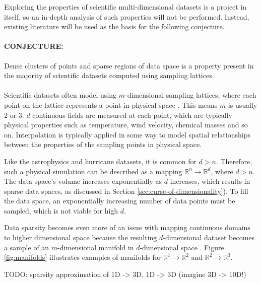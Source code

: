 Exploring the properties of scientific multi-dimensional datasets is a project in itself, so an in-depth analysis of such properties will not be performed. Instead, existing literature will be used as the basis for the following conjecture.

\paragraph{\textbf{CONJECTURE:}} Dense clusters of points and sparse regions of data space is a property present in the majority of scientific datasets computed using sampling lattices.
\paragraph{}

Scientific datasets often model using $m$-dimensional sampling lattices, where each point on the lattice represents a point in physical space \cite{TODO}. This means $m$ is usually 2 or 3. $d$ continuous fields are measured at each point, which are typically physical properties such as temperature, wind velocity, chemical masses and so on. Interpolation is typically applied in some way to model spatial relationships between the properties of the sampling points in physical space.

Like the astrophysics and hurricane datasets, it is common for $d > n$. Therefore, such a physical simulation can be described as a mapping $\mathbb{R}^n \rightarrow \mathbb{R}^d$, where $d > n$. The data space's volume increases exponentially as $d$ increases, which results in sparse data spaces, as discussed in Section \ref{sec:curse-of-dimensionality}). To fill the data space, an exponentially increasing number of data points must be sampled, which is not viable for high $d$.

Data sparsity becomes even more of an issue with mapping continuous domains to higher dimensional space because the resulting $d$-dimensional dataset becomes a sample of an $m$-dimensional manifold in $d$-dimensional space \cite{TODO}. Figure \ref{fig:manifolds} illustrates examples of manifolds for $\mathbb{R}^1 \rightarrow \mathbb{R}^2$ and $\mathbb{R}^2 \rightarrow \mathbb{R}^3$.

TODO: sparsity approximation of 1D -> 3D, 1D -> 3D (imagine 3D -> 10D!)

